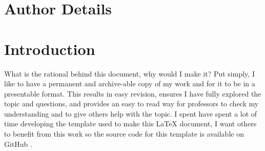 \documentclass[colorlinks,11pt,a4paper,normalphoto,withhyper,ragged2e]{altareport}
\begin{document}
\MakeReportTitlePage


\setcounter{page}{1}






\section*{Author Details}
\makeauthordetails

\setcounter{tocdepth}{2} 
\tableofcontents %





\section*{Introduction}
What is the rational behind this document, why would I make it? \linebreak
Put simply, I like to have a permanent and archive-able copy of my work and for it to be in a presentable format. This results in easy revision, ensures I have fully explored the topic and questions, and provides an easy to read way for professors to check my understanding and to give others help with the topic. \linebreak 
I spent have spent a lot of time developing the template used to make this {\LaTeX} document, I want others to benefit from this work so the source code for this template is available on GitHub \cite{JenningsWilson2021}.
\newpage
{} %
\end{document}
